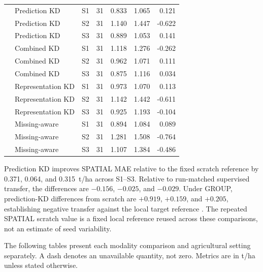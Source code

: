\documentclass[runningheads]{venue/lncs/llncs}
\begin{document}
\begin{longtable}{lllrrrr}
& Prediction KD & S1 & 31 & 0.833 & 1.065 & 0.121\\
& Prediction KD & S2 & 31 & 1.140 & 1.447 & -0.622\\
& Prediction KD & S3 & 31 & 0.889 & 1.053 & 0.141\\
& Combined KD & S1 & 31 & 1.118 & 1.276 & -0.262\\
& Combined KD & S2 & 31 & 0.962 & 1.071 & 0.111\\
& Combined KD & S3 & 31 & 0.875 & 1.116 & 0.034\\
& Representation KD & S1 & 31 & 0.973 & 1.070 & 0.113\\
& Representation KD & S2 & 31 & 1.142 & 1.442 & -0.611\\
& Representation KD & S3 & 31 & 0.925 & 1.193 & -0.104\\
& Missing-aware & S1 & 31 & 0.894 & 1.084 & 0.089\\
& Missing-aware & S2 & 31 & 1.281 & 1.508 & -0.764\\
& Missing-aware & S3 & 31 & 1.107 & 1.384 & -0.486\\
\bottomrule
\end{longtable}

Prediction KD improves SPATIAL MAE relative to the fixed scratch reference by 0.371, 0.064, and 0.315~t/ha across S1--S3. Relative to run-matched supervised transfer, the differences are $-0.156$, $-0.025$, and $-0.029$. Under GROUP, prediction-KD differences from scratch are $+0.919$, $+0.159$, and $+0.205$, establishing negative transfer against the local target reference \cite{Wang2019NegativeTransfer}. The repeated SPATIAL scratch value is a fixed local reference reused across these comparisons, not an estimate of seed variability.

The following tables present each modality comparison and agricultural setting separately. A dash denotes an unavailable quantity, not zero. Metrics are in t/ha unless stated otherwise.
\end{document}
